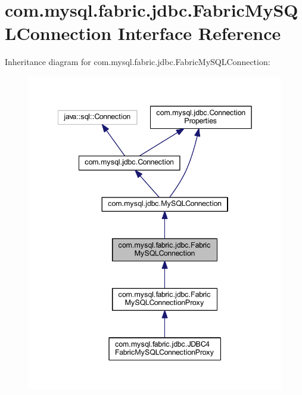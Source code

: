 \hypertarget{interfacecom_1_1mysql_1_1fabric_1_1jdbc_1_1_fabric_my_s_q_l_connection}{}\section{com.\+mysql.\+fabric.\+jdbc.\+Fabric\+My\+S\+Q\+L\+Connection Interface Reference}
\label{interfacecom_1_1mysql_1_1fabric_1_1jdbc_1_1_fabric_my_s_q_l_connection}


Inheritance diagram for com.\+mysql.\+fabric.\+jdbc.\+Fabric\+My\+S\+Q\+L\+Connection\+:\nopagebreak
\begin{figure}[H]
\begin{center}
\leavevmode
\includegraphics[width=342pt]{interfacecom_1_1mysql_1_1fabric_1_1jdbc_1_1_fabric_my_s_q_l_connection__inherit__graph}
\end{center}
\end{figure}


